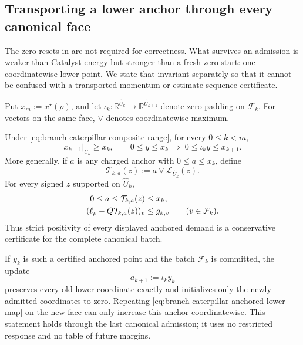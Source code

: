 \subsection{Transporting a lower anchor through every canonical face}
\label{sec:branch-caterpillar-transported-lower-splice}

The zero resets in
 are not required for
correctness.  What survives an admission is weaker than Catalyst energy but
stronger than a fresh zero start: one coordinatewise lower point.  We state
that invariant separately so that it cannot be confused with a transported
momentum or estimate-sequence certificate.

Put $x_m:=x^\star(\rho)$, and let
$\iota_k:\mathbb R^{\widehat U_k}\to
\mathbb R^{\widehat U_{k+1}}$ denote zero padding on
$\mathcal F_k$.  For vectors on the same face, $\vee$ denotes coordinatewise
maximum.

\begin{lemma}
\label{lem:branch-caterpillar-anchored-lower-transport}
Under \cref{eq:branch-caterpillar-composite-range}, for every $0\leq k<m$,
\begin{equation}
 x_{k+1}\big|_{\widehat U_k}\geq x_k,
 \qquad
 0\leq y\leq x_k
 \ \Longrightarrow\
 0\leq\iota_k y\leq x_{k+1}.
 \label{eq:branch-caterpillar-padded-lower-transport}
\end{equation}
More generally, if $a$ is any charged anchor with $0\leq a\leq x_k$, define
\begin{equation}
 \mathcal T_{k,a}(z):=
 a\vee\mathcal L_{\widehat U_k}(z).
 \label{eq:branch-caterpillar-anchored-lower-map}
\end{equation}
For every signed $z$ supported on $\widehat U_k$,
\begin{align}
 0\leq a\leq\mathcal T_{k,a}(z)&\leq x_k,
 \notag\\
 (\ell_\rho-Q\mathcal T_{k,a}(z))_v
 &\leq g_{k,v}
 \qquad(v\in\mathcal F_k).
 \label{eq:branch-caterpillar-anchored-lower-invariant}
\end{align}
Thus strict positivity of every displayed anchored demand is a conservative
certificate for the complete canonical batch.

If $y_k$ is such a certified anchored point and the batch
$\mathcal F_k$ is committed, the update
\begin{equation}
 a_{k+1}:=\iota_k y_k
 \label{eq:branch-caterpillar-transported-anchor-update}
\end{equation}
preserves every old lower coordinate exactly and initializes only the newly
admitted coordinates to zero.  Repeating
\cref{eq:branch-caterpillar-anchored-lower-map} on the new face can only
increase this anchor coordinatewise.  This statement holds through the last
canonical admission; it uses no restricted response and no table of future
margins.
\end{lemma}

